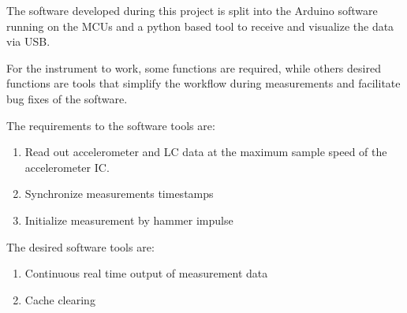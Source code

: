 The software developed during this project is split into the Arduino software running on the \acs{MCU}s and a python based tool to receive and visualize the data via \ac{USB}.

For the instrument to work, some functions are required, while others desired functions are tools that simplify the workflow during measurements and facilitate bug fixes of the software.

The requirements to the software tools are:
\begin{enumerate}[label=\emph{m\arabic*}, itemindent=3em, labelsep=2em]
    \item Read out accelerometer and \ac{LC} data at the maximum sample speed of the accelerometer \ac{IC}. \label{req:read_out}
    \item Synchronize measurements timestamps\label{req:sync}
    \item Initialize measurement by hammer impulse\label{req:init}
\end{enumerate}

The desired software tools are:
\begin{enumerate}[label=\emph{w\arabic*}, itemindent=3em, labelsep=2em]
    \item Continuous real time output of measurement data\label{des:cont_out}
    \item Cache clearing\label{des:cache}
\end{enumerate}


